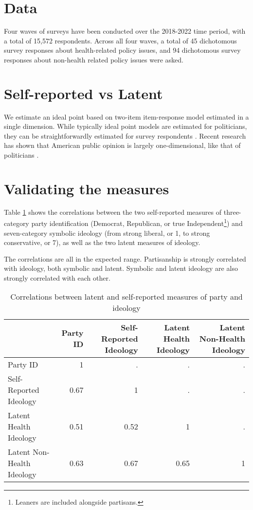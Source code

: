 \documentclass[
  oneside]{book}
\begin{document}
\hypertarget{data}{%
\section{Data}\label{data}}

Four waves of surveys have been conducted over the 2018-2022 time period, with a total of 15,572 respondents. Across all four waves, a total of 45 dichotomous survey responses about health-related policy issues, and 94 dichotomous survey responses about non-health related policy issues were asked.

\hypertarget{self-reported-vs-latent}{%
\section{Self-reported vs Latent}\label{self-reported-vs-latent}}

We estimate an ideal point based on two-item item-response model \citep{Clinton:2004} estimated in a single dimension. While typically ideal point models are estimated for politicians, they can be straightforwardly estimated for survey respondents \citep{Jessee:2012}. Recent research has shown that American public opinion is largely one-dimensional, like that of politicians \citep{Fowler:2022}.

\hypertarget{validating-the-measures}{%
\section{Validating the measures}\label{validating-the-measures}}

Table \ref{tab:ideol-corr} shows the correlations between the two self-reported measures of three-category party identification (Democrat, Republican, or true Independent\footnote{Leaners are included alongside partisans.}) and seven-category symbolic ideology (from strong liberal, or 1, to strong conservative, or 7), as well as the two latent measures of ideology.

The correlations are all in the expected range. Partisanship is strongly correlated with ideology, both symbolic and latent. Symbolic and latent ideology are also strongly correlated with each other.

\begin{table}

\caption{\label{tab:ideol-corr}Correlations between latent and self-reported measures of party and ideology}
\centering
\begin{tabular}[t]{lrrrr}
\toprule
  & Party ID & Self-Reported Ideology & Latent Health Ideology & Latent Non-Health Ideology\\
\midrule
Party ID & 1 & . & . & .\\
Self-Reported Ideology & \num{.67} & 1 & . & .\\
Latent Health Ideology & \num{.51} & \num{.52} & 1 & .\\
Latent Non-Health Ideology & \num{.63} & \num{.67} & \num{.65} & 1\\
\bottomrule
\end{tabular}
\end{table}
\end{document}
